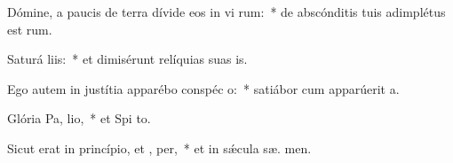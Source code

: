 \item Dómine, a paucis de terra dívide eos in vi rum:~* de abscónditis tuis adimplétus est  rum.
\item Saturá  liis:~* et dimisérunt relíquias suas  is.
\item Ego autem in justítia apparébo conspéc o:~* satiábor cum apparúerit  a.
\item Glória Pa,  lio,~* et Spi to.
\item Sicut erat in princípio, et ,  per,~* et in sǽcula sæ. men.
